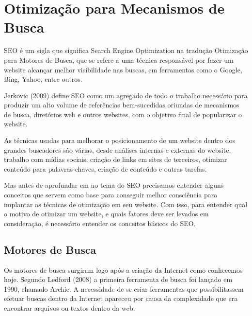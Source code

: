 \documentclass[
	12pt,				%
	openright,			%
	twoside,			%
	a4paper,			%
	english,			%
	french,				%
	spanish,			%
	brazil				%
	]{abntex2}
\begin{document}


\chapter{Otimização para Mecanismos de Busca}

SEO é um sigla que significa Search Engine Optimization na tradução Otimização para Motores de Busca, que se refere a uma técnica responsável por fazer um website alcançar melhor visibilidade nas buscas, em ferramentas como o Google, Bing, Yahoo, entre outros. 

Jerkovic (2009) define SEO como um agregado de todo o trabalho necessário para produzir um alto volume de referências bem-sucedidas oriundas de mecanismos de busca, diretórios web e outros websites, com o objetivo final de popularizar o website.

As técnicas usadas para melhorar o posicionamento de um website dentro dos grandes buscadores são várias, desde análises internas e externas do website, trabalho com mídias sociais, criação de links em sites de terceiros, otimizar conteúdo para palavras-chaves, criação de conteúdo e outras tarefas.

Mas antes de aprofundar em no tema do SEO precisamos entender alguns conceitos que servem como base para conseguir melhor consciência para implantar as técnicas de otimização em seu website. Com isso, para entender qual o motivo de otimizar um website, e quais fatores deve ser levados em consideração, é necessário entender os conceitos básicos do SEO.

\section{Motores de Busca}

Os motores de busca surgiram logo após a criação da Internet como conhecemos hoje. Segundo Ledford (2008) a primeira ferramenta de busca foi lançado em 1990, chamado Archie. A necessidade de se criar ferramentas que possibilitassem efetuar buscas dentro da Internet apareceu por causa da complexidade que era encontrar arquivos ou textos dentro da web.
\end{document}
